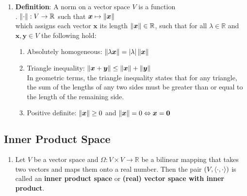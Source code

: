 \begin{enumerate}
    \item \textbf{Definition}: A norm on a vector space $V$ is a function
    \hfill \cite{mfml/book/mml/Deisenroth-Faisal-Ong}
    \\
    .\hfill
    $\left\| \cdot \right\|: V \to \mathbb{R}$ such that $\bm{x} \mapsto \left\| \bm{x} \right\|$
    \hfill \cite{mfml/book/mml/Deisenroth-Faisal-Ong}
    \\
    which assigns each vector $\bm{x}$ its length $\left\| \bm{x} \right\| \in \mathbb{R}$, such that for all $\lambda \in \mathbb{R}$ and $\bm{x}, \bm{y} \in V$ the following hold:
    \hfill \cite{mfml/book/mml/Deisenroth-Faisal-Ong}
    \begin{enumerate}
        \item Absolutely homogeneous: $\left\| \lambda \bm{x} \right\| = \left| \lambda \right| \left\| \bm{x} \right\|$
        \hfill \cite{mfml/book/mml/Deisenroth-Faisal-Ong}

        \item Triangle inequality: $\left\| \bm{x} + \bm{y} \right\| \leq \left\| \bm{x} \right\| + \left\| \bm{y} \right\|$
        \hfill \cite{mfml/book/mml/Deisenroth-Faisal-Ong}
        \\
        In geometric terms, the triangle inequality states that for any triangle, the sum of the lengths of any two sides must be greater than or equal to the length of the remaining side.
        

        \item Positive definite: $\left\| \bm{x} \right\| \geq 0$ and $\left\| \bm{x} \right\| = 0 \Leftrightarrow \bm{x} = \bm{0}$
        \hfill \cite{mfml/book/mml/Deisenroth-Faisal-Ong}
    \end{enumerate}
\end{enumerate}




\subsection{Inner Product Space}

\begin{enumerate}
    \item Let $V$ be a vector space and $\Omega  : V \times  V \to  \mathbb{R}$ be a bilinear mapping that takes two vectors and maps them onto a real number. 
    Then the pair $(V, \langle\cdot, \cdot\rangle)$ is called an \textbf{inner product space} or \textbf{(real) vector space with inner product}.
\end{enumerate}




